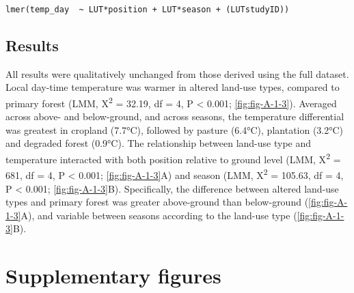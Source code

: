 \documentclass[12pt,a4paper,]{report}
\theoremstyle{definition}
\theoremstyle{definition}
\theoremstyle{definition}
\theoremstyle{remark}
\begin{document}
\texttt{lmer(temp\_day\ \ \textasciitilde{}\ LUT*position\ +\ LUT*season\ +\ (LUT\textbar{}studyID))}

\subsection{Results}\label{results-2}

All results were qualitatively unchanged from those derived using the
full dataset. Local day-time temperature was warmer in altered land-use
types, compared to primary forest (LMM, Χ\textsuperscript{2} = 32.19, df
= 4, P \textless{} 0.001; \autoref{fig:fig-A-1-3}). Averaged across
above- and below-ground, and across seasons, the temperature
differential was greatest in cropland (7.7°C), followed by pasture
(6.4°C), plantation (3.2°C) and degraded forest (0.9°C). The
relationship between land-use type and temperature interacted with both
position relative to ground level (LMM, Χ\textsuperscript{2} = 681, df =
4, P \textless{} 0.001; \autoref{fig:fig-A-1-3}A) and season (LMM,
Χ\textsuperscript{2} = 105.63, df = 4, P \textless{} 0.001;
\autoref{fig:fig-A-1-3}B). Specifically, the difference between altered
land-use types and primary forest was greater above-ground than
below-ground (\autoref{fig:fig-A-1-3}A), and variable between seasons
according to the land-use type (\autoref{fig:fig-A-1-3}B).

\pagebreak

\section{Supplementary figures}\label{supplementary-figures}
\end{document}
